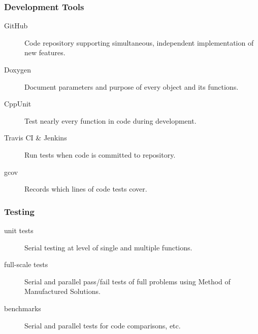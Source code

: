 \documentclass[aspectratio=169]{beamer}
\begin{document}
\begin{frame}
  \frametitle{Development Tools}

  \begin{description}
  \item[GitHub] Code repository supporting simultaneous, independent implementation of new features.
  \item[Doxygen] Document parameters and purpose of every object and its functions.
  \item[CppUnit] Test nearly every function in code during development.
  \item[Travis CI \& Jenkins] Run tests when code is committed to repository.
  \item[gcov] Records which lines of code tests cover.
  \end{description}

\end{frame}

\begin{frame}
  \frametitle{Testing}

  \begin{description}
  \item[unit tests] Serial testing at level of single and multiple functions.
  \item[full-scale tests] Serial and parallel pass/fail tests of full problems using Method of Manufactured Solutions.
  \item[benchmarks] Serial and parallel tests for code comparisons, etc.
  \end{description}

\end{frame}
\end{document}
